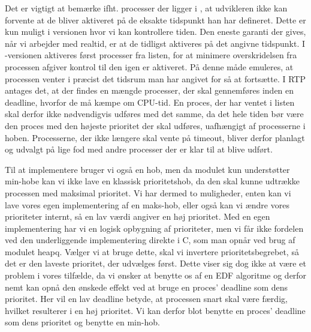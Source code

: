Det er vigtigt at bemærke ifht. processer der ligger i , at udvikleren ikke kan forvente at de bliver aktiveret på de eksakte tidspunkt han har defineret. Dette er kun muligt i \des versionen hvor vi kan kontrollere tiden. Den eneste garanti der gives, når vi arbejder med realtid, er at de tidligst aktiveres på det angivne tidspunkt. I -versionen  aktiveres først processer fra  listen, for at minimere overskridelsen fra processen afgiver kontrol til den igen er aktiveret. På denne måde emuleres, at processen venter i præcist det tidsrum man har angivet for så at fortsætte. I RTP antages det, at der findes en mængde processer, der skal gennemføres inden en deadline, hvorfor de må kæmpe om CPU-tid. En proces, der har ventet i  listen skal derfor ikke nødvendigvis udføres med det samme, da det hele tiden bør være den proces med den højeste prioritet der skal udføres, uafhængigt af processerne i  hoben. Processerne, der ikke længere skal vente på timeout, bliver derfor planlagt og udvalgt på lige fod med andre processer der er klar til at blive udført. 

Til at implementere  bruger vi også en hob, men da modulet  kun understøtter min-hobe kan vi ikke lave en klassisk prioritetshob, da den skal kunne udtrække processen med maksimal prioritet. Vi har dermed to muligheder, enten kan vi lave vores egen implementering af en maks-hob, eller også kan vi ændre vores prioriteter internt, så en lav værdi angiver en høj prioritet. Med en egen implementering har vi en  logisk opbygning af prioriteter, men vi får ikke fordelen ved den underliggende implementering  direkte i C, som man opnår ved brug af modulet heapq. Vælger vi at bruge dette, skal vi invertere prioritetsbegrebet, så det er den laveste prioritet, der udvælges først. Dette viser  sig dog ikke at være et problem  i vores tilfælde, da vi ønsker at benytte os af en EDF algoritme og derfor nemt kan opnå den ønskede effekt ved at bruge en proces' deadline som dens prioritet. Her vil en lav deadline betyde, at processen snart skal være færdig, hvilket resulterer i en høj prioritet.
Vi kan derfor blot benytte en proces' deadline som dens prioritet og benytte en min-hob. 


